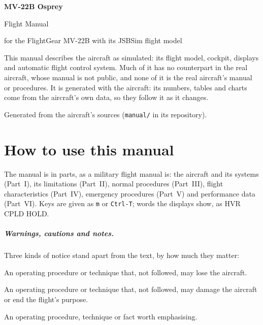 \documentclass[11pt,a4paper,oneside]{book}
\newcommand{\key}[1]{\texttt{#1}}
\newcommand{\ann}[1]{\textsf{#1}}
\begin{document}
\frontmatter
\begin{titlepage}
\centering
\vspace*{50mm}
{\Huge\bfseries MV-22B Osprey\par}
\vspace{6mm}
{\LARGE Flight Manual\par}
\vspace{4mm}
{\large for the FlightGear MV-22B with its JSBSim flight model\par}
\vspace{30mm}
\begin{minipage}{0.75\textwidth}\small
This manual describes the aircraft as simulated: its flight model, cockpit, displays and automatic flight control
system. Much of it has no counterpart in the real aircraft, whose manual is not public, and none of it is the real
aircraft's manual or procedures. It is generated with the aircraft: its numbers, tables and charts come from the
aircraft's own data, so they follow it as it changes.
\end{minipage}
\vfill
{\small Generated from the aircraft's sources (\texttt{manual/} in its repository).\par}
\end{titlepage}

\chapter*{How to use this manual}
The manual is in parts, as a military flight manual is: the aircraft and its systems (Part~I), its limitations (Part~II),
normal procedures (Part~III), flight characteristics (Part~IV), emergency procedures (Part~V) and performance data
(Part~VI). Keys are given as \key{m} or \key{Ctrl-T}; words the displays show, as \ann{HVR CPLD HOLD}.

\paragraph{Warnings, cautions and notes.} Three kinds of notice stand apart from the text, by how much they matter:
\begin{warning}
An operating procedure or technique that, not followed, may lose the aircraft.
\end{warning}
\begin{caution}
An operating procedure or technique that, not followed, may damage the aircraft or end the flight's purpose.
\end{caution}
\begin{note}
An operating procedure, technique or fact worth emphasising.
\end{note}
\end{document}
